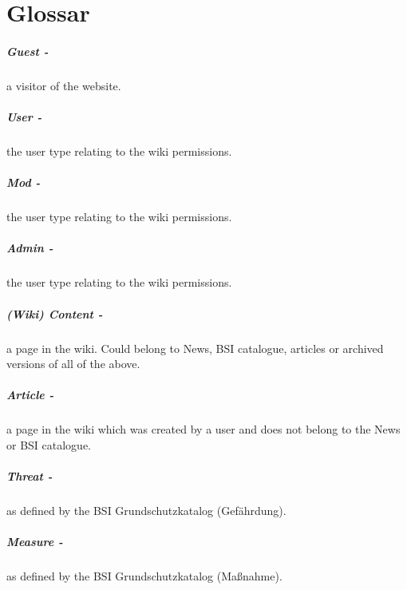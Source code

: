\appendix
\chapter{Glossar}

\paragraph{Guest -} a visitor of the website.
\paragraph{User -} the user type relating to the wiki permissions.
\paragraph{Mod -} the user type relating to the wiki permissions. 
\paragraph{Admin -} the user type relating to the wiki permissions. 
\paragraph{(Wiki) Content -} a page in the wiki. Could belong to News, BSI catalogue, articles or archived versions of all of the above.
\paragraph{Article -} a page in the wiki which was created by a user and does not belong to the News or BSI catalogue.
\paragraph{Threat -} as defined by the BSI Grundschutzkatalog (Gef\"ahrdung).
\paragraph{Measure -} as defined by the BSI Grundschutzkatalog (Ma\ss nahme).
